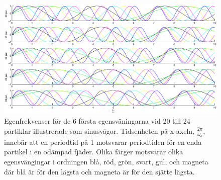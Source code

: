 \documentclass[12pt,a4paper]{article}
\begin{document}
		\begin{center}
\begin{figure}
\includegraphics[width=1.2\textwidth]{egenfrekvenser.eps}
\caption{Egenfrekvenser för de 6 första egensväningarna vid 20 till 24 partiklar illustrerade som sinusvågor. Tidsenheten på x-axeln, $\frac{2\pi}{\omega_o}$, innebär att en periodtid på 1 motsvarar periodtiden för en enda partikel i en odämpad fjäder. Olika färger motsvarar olika egensvängingar i ordningen blå, röd, grön, svart, gul, och magneta där blå är för den lägsta och magneta är för den sjätte lägsta.}
\label{egenf}
\end{figure}
\end{center}
\end{document}
